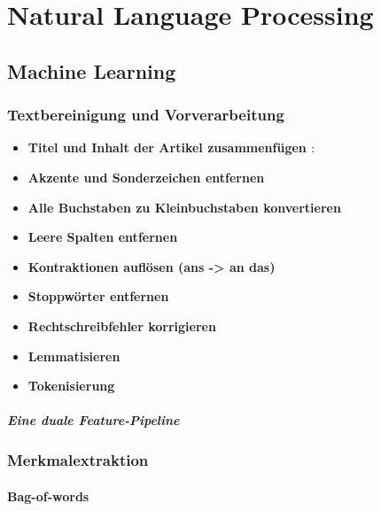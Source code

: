 \chapter{Natural Language Processing}
\label{chap:nlp}

\section{Machine Learning}
\label{sec:ml}

\cite{sabir2025}
\cite{Buddhadev2025}

\subsection{Textbereinigung und Vorverarbeitung}
\label{sec:text_vorverarbeitung}

\begin{itemize}
    \item \textbf{Titel und Inhalt der Artikel zusammenfügen \cite{Buddhadev2025}}: 
    \item \textbf{Akzente und Sonderzeichen entfernen \cite{Buddhadev2025} \cite{sabir2025}}
    \item \textbf{Alle Buchstaben zu Kleinbuchstaben konvertieren \cite{sabir2025} \cite{SUDHAKAR2024101028}}
    \item \textbf{Leere Spalten entfernen \cite{SUDHAKAR2024101028}}
    \item \textbf{Kontraktionen auflösen (ans -> an das) \cite{Buddhadev2025}}
    \item \textbf{Stoppwörter entfernen \cite{sabir2025} \cite{Buddhadev2025}}
    \item \textbf{Rechtschreibfehler korrigieren \cite{sabir2025}} 
    \item \textbf{Lemmatisieren \cite{Buddhadev2025} \cite{sabir2025}}
    \item \textbf{Tokenisierung \cite{sabir2025}}
\end{itemize}

\paragraph{Eine duale Feature-Pipeline} 

\subsection{Merkmalextraktion}
\label{sec:merkmalextraktion}

\subsubsection{Bag-of-words}

